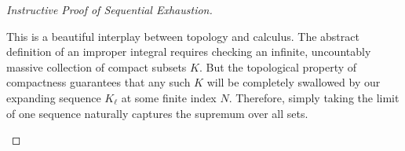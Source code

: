\begin{proof}[Instructive Proof of Sequential Exhaustion]
\begin{math-stroke}
\begin{explanation-of-steps}
This is a beautiful interplay between topology and calculus. The abstract definition of an improper integral requires checking an infinite, uncountably massive collection of compact subsets $K$. But the topological property of compactness guarantees that any such $K$ will be completely swallowed by our expanding sequence $K_\ell$ at some finite index $N$. Therefore, simply taking the limit of one sequence naturally captures the supremum over all sets.
\end{explanation-of-steps}
\end{math-stroke}
\end{proof}
